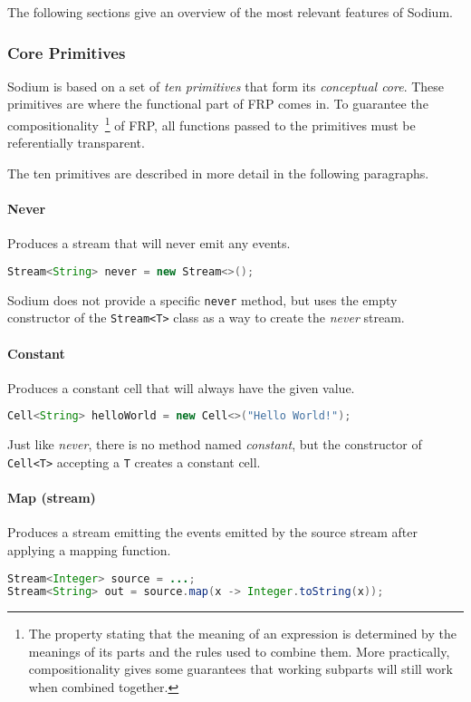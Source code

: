 The following sections give an overview of the most relevant features of Sodium.

\subsubsection{Core Primitives}

Sodium is based on a set of \textit{ten primitives} that form its \textit{conceptual core}.
%
These primitives are where the functional part of FRP comes in.
%
To guarantee the compositionality~\footnote
{
  The property stating that the meaning of an expression is determined by the meanings of its parts and the rules used to combine them.
  More practically, compositionality gives some guarantees that working subparts will still work when combined together.
}
%
of FRP, all functions passed to the primitives must be referentially transparent.

The ten primitives are described in more detail in the following paragraphs.

\paragraph{Never}
Produces a stream that will never emit any events.
%
\begin{lstlisting}[frame=single, language=java]
Stream<String> never = new Stream<>();
\end{lstlisting}
%
Sodium does not provide a specific \texttt{never} method, but uses the empty constructor of the \texttt{Stream<T>} class as a way to create the \textit{never} stream.

\paragraph{Constant}
Produces a constant cell that will always have the given value.
%
\begin{lstlisting}[frame=single, language=java]
Cell<String> helloWorld = new Cell<>("Hello World!");
\end{lstlisting}
%
Just like \textit{never}, there is no method named \textit{constant}, but the constructor of \texttt{Cell<T>} accepting a \texttt{T} creates a constant cell.

\paragraph{Map (stream)}
Produces a stream emitting the events emitted by the source stream after applying a mapping function.
%
\begin{lstlisting}[frame=single, language=java]
Stream<Integer> source = ...;
Stream<String> out = source.map(x -> Integer.toString(x));
\end{lstlisting}  

